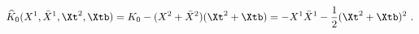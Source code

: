 \begin{equation}
\widehat{K}_0(X^1,\bar{X}^{1},\Xt^2,\Xtb)
=K_0-(X^2+\bar{X}^{2})(\Xt^2+\Xtb)
=-X^1\bar{X}^1-{1\over 2}(\Xt^2+\Xtb)^2 \ .
\label{k0;alpha}
\end{equation}

